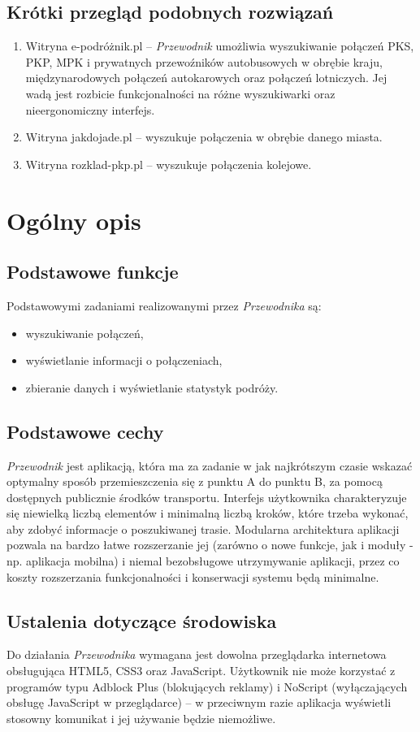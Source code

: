 \documentclass[12pt,a4paper]{report}
\begin{document}
\subsection{Krótki przegląd podobnych rozwiązań}
\begin{enumerate}
	\item Witryna e-podróżnik.pl -- \emph{Przewodnik} umożliwia wyszukiwanie połączeń PKS, PKP, MPK i prywatnych przewoźników autobusowych w obrębie kraju, międzynarodowych połączeń autokarowych oraz połączeń lotniczych. Jej wadą jest rozbicie funkcjonalności na różne wyszukiwarki oraz nieergonomiczny interfejs.
	\item Witryna jakdojade.pl -- wyszukuje połączenia w obrębie danego miasta.
	\item Witryna rozklad-pkp.pl -- wyszukuje połączenia kolejowe.
\end{enumerate}
\newpage
\section{Ogólny opis}
\subsection{Podstawowe funkcje}
	Podstawowymi zadaniami realizowanymi przez \emph{Przewodnika} są:
	\begin{itemize}
	 	\item wyszukiwanie połączeń,
	 	\item wyświetlanie informacji o połączeniach,
	 	\item zbieranie danych i wyświetlanie statystyk podróży.
	\end{itemize}
\subsection{Podstawowe cechy}
	\emph{Przewodnik} jest aplikacją, która ma za zadanie w jak najkrótszym czasie wskazać optymalny sposób przemieszczenia się z punktu A do punktu B, za pomocą dostępnych publicznie środków transportu. Interfejs użytkownika charakteryzuje się niewielką liczbą elementów i minimalną liczbą kroków, które trzeba wykonać, aby zdobyć informacje o poszukiwanej trasie. Modularna architektura aplikacji pozwala na bardzo łatwe rozszerzanie jej (zarówno o nowe funkcje, jak i moduły - np. aplikacja mobilna) i niemal bezobsługowe utrzymywanie aplikacji, przez co koszty rozszerzania funkcjonalności i konserwacji systemu będą minimalne.
\subsection{Ustalenia dotyczące środowiska}
	Do działania \emph{Przewodnika} wymagana jest dowolna przeglądarka internetowa obsługująca HTML5, CSS3 oraz JavaScript. Użytkownik nie może korzystać z programów typu Adblock Plus (blokujących reklamy) i NoScript (wyłączających obsługę JavaScript w przeglądarce) -- w przeciwnym razie aplikacja wyświetli stosowny komunikat i jej używanie będzie niemożliwe.
\end{document}
